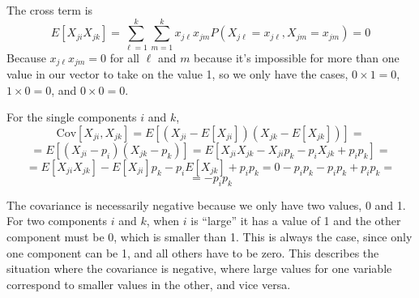 \begin{enumerate}[label= (\alph*)]
    The cross term is
    \[
        E[X_{ji}X_{jk}]
        =
        \sum_{\ell=1}^{k}\sum_{m=1}^{k}x_{j\ell}x_{jm}P(X_{j\ell} = x_{j\ell}, X_{jm} = x_{jm})
        =
        0
    \]
    Because $x_{j\ell}x_{jm} = 0$ for all $\ell$ and $m$ because it's impossible for more than one value in our vector to take on the value 1, so we only have the cases, $0 \times 1 = 0$, $1 \times 0 = 0$, and $0 \times 0 = 0$.

    For the single components $i$ and $k$,
    \[
        \text{Cov}[X_{ji}, X_{jk}]
        =
        E[(X_{ji} - E[X_{ji}])(X_{jk} - E[X_{jk}])]
        =
    \]
    \[
        =
        E[(X_{ji} - p_{i})(X_{jk} - p_{k})]
        =
        E[X_{ji}X_{jk} - X_{ji}p_{k} - p_{i}X_{jk} + p_{i}p_{k}]
        =
    \]
    \[
        =
        E[X_{ji}X_{jk}] - E[X_{ji}]p_{k} - p_{i}E[X_{jk}] + p_{i}p_{k}
        =
        0 - p_{i}p_{k} - p_{i}p_{k} + p_{i}p_{k}
        =
    \]
    \[
        =
        - p_{i}p_{k}
    \]

    The covariance is necessarily negative because we only have two values, 0 and 1. For two components $i$ and $k$, when $i$ is ``large'' it has a value of 1 and the other component must be 0, which is smaller than 1. This is always the case, since only one component can be 1, and all others have to be zero. This describes the situation where the covariance is negative, where large values for one variable correspond to smaller values in the other, and vice versa.
\end{enumerate}
